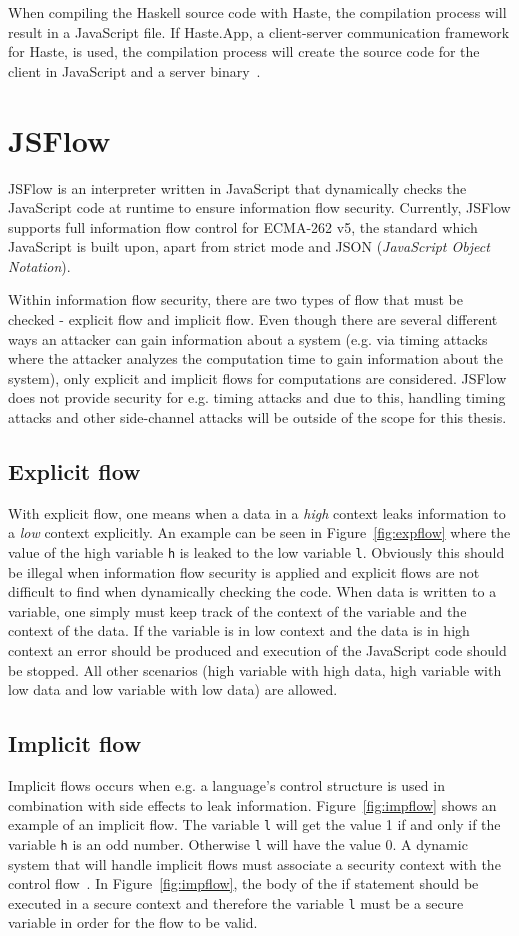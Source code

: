 When compiling the Haskell source code with Haste, the compilation process will result in a JavaScript file. If Haste.App, a client-server communication framework for Haste, is used, the compilation process will create the source code for the client in JavaScript and a server binary~\cite{haste-symposium}.

\section{JSFlow}
JSFlow is an interpreter written in JavaScript that dynamically checks the JavaScript code at runtime to ensure information flow security. Currently, JSFlow supports full information flow control for ECMA-262 v5, the standard which JavaScript is built upon, apart from strict mode and JSON (\emph{JavaScript Object Notation}).

Within information flow security, there are two types of flow that must be checked - explicit flow and implicit flow. Even though there are several different ways an attacker can gain information about a system (e.g. via timing attacks where the attacker analyzes the computation time to gain information about the system), only explicit and implicit flows for computations are considered. JSFlow does not provide security for e.g. timing attacks and due to this, handling timing attacks and other side-channel attacks will be outside of the scope for this thesis.
\subsection{Explicit flow}
With explicit flow, one means when a data in a \emph{high} context leaks information to a \emph{low} context explicitly. An example can be seen in Figure~\ref{fig:expflow} where the value of the high variable {\tt h} is leaked to the low variable {\tt l}. Obviously this should be illegal when information flow security is applied and explicit flows are not difficult to find when dynamically checking the code. When data is written to a variable, one simply must keep track of the context of the variable and the context of the data. If the variable is in low context and the data is in high context an error should be produced and execution of the JavaScript code should be stopped. All other scenarios (high variable with high data, high variable with low data and low variable with low data) are allowed.
\subsection{Implicit flow}
\label{chapter:implicit_flow}
Implicit flows occurs when e.g. a language's control structure is used in combination with side effects to leak information. Figure~\ref{fig:impflow} shows an example of an implicit flow. The variable {\tt l} will get the value 1 if and only if the variable {\tt h} is an odd number. Otherwise {\tt l} will have the value 0. A dynamic system that will handle implicit flows must associate a security context with the control flow~\cite{jsflow-csf12}. In Figure~\ref{fig:impflow}, the body of the if statement should be executed in a secure context and therefore the variable {\tt l} must be a secure variable in order for the flow to be valid.

